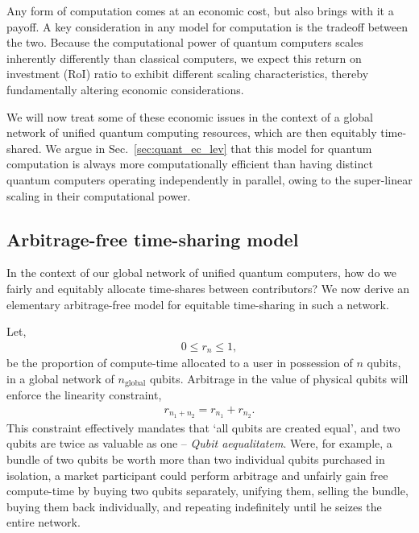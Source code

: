 \documentclass[aps, rmp, twocolumn, amsmath, amssymb, nofootinbib, superscriptaddress, longbibliography, floatfix, table-of-contents, eqsecnum]{revtex4-1}
\begin{document}
Any form of computation comes at an economic cost, but also brings with it a payoff. A key consideration in any model for computation is the tradeoff between the two. Because the computational power of quantum computers scales inherently differently than classical computers, we expect this return on investment (RoI) ratio to exhibit different scaling characteristics, thereby fundamentally altering economic considerations.

We will now treat some of these economic issues in the context of a global network of unified quantum computing resources, which are then equitably time-shared. We argue in Sec.~\ref{sec:quant_ec_lev} that this model for quantum computation is always more computationally efficient than having distinct quantum computers operating independently in parallel, owing to the super-linear scaling in their computational power.

%
%

\subsection{Arbitrage-free time-sharing model}

In the context of our global network of unified quantum computers, how do we fairly and equitably allocate time-shares between contributors? We now derive an elementary arbitrage-free model for equitable time-sharing in such a network.

Let,
\begin{align}
	0\leq r_n \leq 1,
\end{align}
be the proportion of compute-time allocated to a user in possession of $n$ qubits, in a global network of $n_\text{global}$ qubits. Arbitrage in the value of physical qubits will enforce the linearity constraint,
\begin{align}
	r_{n_1+n_2} = r_{n_1} + r_{n_2}.
\end{align}
This constraint effectively mandates that `all qubits are created equal', and two qubits are twice as valuable as one -- \textit{Qubit aequalitatem}. Were, for example, a bundle of two qubits be worth more than two individual qubits purchased in isolation, a market participant could perform arbitrage and unfairly gain free compute-time by buying two qubits separately, unifying them, selling the bundle, buying them back individually, and repeating indefinitely until he seizes the entire network.
\end{document}
